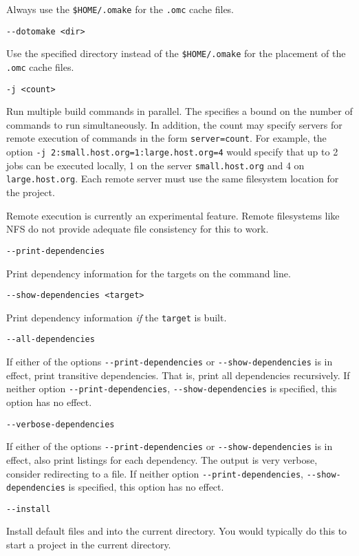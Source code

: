 Always use the \verb+$HOME/.omake+ for the \verb+.omc+ cache files.

 \verb+--dotomake <dir>+

Use the specified directory instead of the \verb+$HOME/.omake+
for the placement of the \verb+.omc+ cache files.

 \verb+-j <count>+

Run multiple build commands in parallel.  The  specifies a
bound on the number of commands to run simultaneously.  In addition, the count may specify servers
for remote execution of commands in the form \verb+server=count+.  For example, the option
\verb+-j 2:small.host.org=1:large.host.org=4+ would specify that up to 2 jobs can be executed
locally, 1 on the server \verb+small.host.org+ and 4 on \verb+large.host.org+.  Each remote server
must use the same filesystem location for the project.

Remote execution is currently an experimental feature.  Remote filesystems like NFS do not provide
adequate file consistency for this to work.

 \verb+--print-dependencies+

Print dependency information for the targets on the command line.

 \verb+--show-dependencies <target>+

Print dependency information \emph{if} the \verb+target+ is built.

 \verb+--all-dependencies+

If either of the options \texttt{-{}-print-dependencies} or
\texttt{-{}-show-dependencies} is in effect, print transitive dependencies.  That is, print all
dependencies recursively.  If neither option \texttt{-{}-print-dependencies},
\texttt{-{}-show-dependencies} is specified, this option has no effect.

 \verb+--verbose-dependencies+

If either of the options \texttt{-{}-print-dependencies} or
\texttt{-{}-show-dependencies} is in effect, also print listings for each dependency.  The output is
very verbose, consider redirecting to a file.  If neither option \texttt{-{}-print-dependencies},
\texttt{-{}-show-dependencies} is specified, this option has no effect.

 \verb+--install+

Install default files  and  into the current directory.  You would
typically do this to start a project in the current directory.

